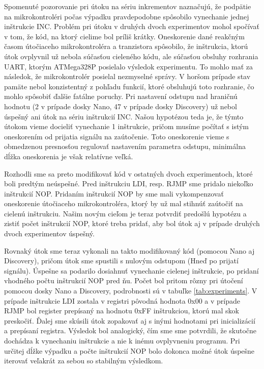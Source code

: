 Spomenuté pozorovanie pri útoku na sériu inkrementov naznačujú, že podpätie na mikrokontroléri počas výpadku pravdepodobne spôsobilo vynechanie jednej inštrukcie INC. Problém pri útoku v druhých dvoch experimentov mohol spočívať v tom, že kód, na ktorý cielime bol príliš krátky. Oneskorenie dané reakčným časom útočiaceho mikrokontroléra a tranzistora spôsobilo, že inštrukcia, ktorú útok ovplyvnil už nebola súčasťou cieleného kódu, ale súčasťou obsluhy rozhrania UART, ktorým ATMega328P posielalo výsledok experimentu. To mohlo mať za následok, že mikrokontrolér posielal nezmyselné správy. V horšom prípade stav pamäte nebol konzistentný z pohľadu funkcií, ktoré obsluhujú toto rozhranie, čo mohlo spôsobiť ďalšie fatálne poruchy. Pri nastavení odstupu nad hraničnú hodnotu (2 v prípade dosky Nano, 47 v prípade dosky Discovery) už nebol úspešný ani útok na sériu inštrukcií INC. Našou hypotézou teda je, že týmto útokom vieme docieliť vynechanie 1 inštrukcie, pričom musíme počítať s istým oneskorením od prijatia signálu na zaútočenie. Toto oneskorenie vieme s obmedzenou presnosťou regulovať nastavením parametra odstupu, minimálna dĺžka oneskorenia je však relatívne veľká.

Rozhodli sme sa preto modifikovať kód v ostatných dvoch experimentoch, ktoré boli predtým neúspešné. Pred inštrukciu LDI, resp. RJMP sme pridalo niekoľko inštrukcií NOP. Pridaním inštrukcií NOP by sme mali vykompenzovať oneskorenie útočiaceho mikrokontroléra, ktorý by už mal stihnúť zaútočiť na cielenú inštrukciu. Našim novým cieľom je teraz potvrdiť predošlú hypotézu a zistiť počet inštrukcií NOP, ktoré treba pridať, aby bol útok aj v prípade druhých dvoch experimentov úspešný.

Rovnaký útok sme teraz vykonali na takto modifikovaný kód (pomocou Nano aj Discovery), pričom útok sme spustili s nulovým odstupom (Hneď po prijatí signálu). Úspešne sa podarilo dosiahnuť vynechanie cielenej inštrukcie, po pridaní vhodného počtu inštrukcií NOP pred ňu. Počet bol pritom rôzny pri útočení pomocou dosky Nano a Discovery, podrobnosti sú v tabuľke \ref{tab:experiments}. V prípade inštrukcie LDI zostala v registri pôvodná hodnota 0x00 a v prípade RJMP bol register prepísaný na hodnotu 0xFF inštrukciou, ktorú mal skok preskočiť. Ďalej sme skúsili útok zopakovať aj s inými hodnotami pri inicializácií a prepísaní registra. Výsledok bol analogický, čím sme  sme potvrdili, že skutočne dochádza k vynechaniu inštrukcie a nie k inému ovplyvneniu programu. Pri určitej dĺžke výpadku a počte inštrukcií NOP bolo dokonca možné útok úspešne iterovať veľakrát za sebou so stabilným výsledkom.

